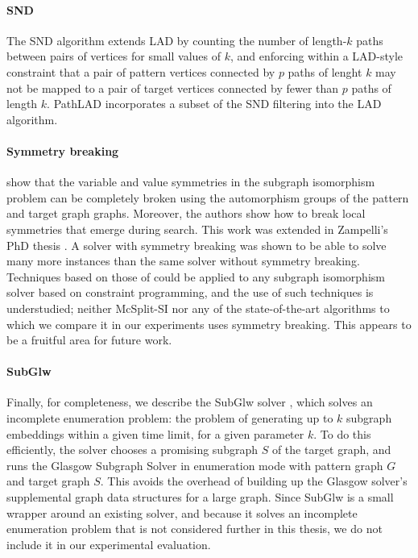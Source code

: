 \paragraph*{SND}
The SND algorithm \citep{DBLP:conf/cp/AudemardLMGP14}
extends LAD by counting the number of length-$k$ paths between
pairs of vertices for small values of $k$, and enforcing within
a LAD-style constraint that 
a pair of pattern vertices connected by $p$ paths of lenght $k$
may not be mapped to a pair of target vertices connected by fewer
than $p$ paths of length $k$.
PathLAD \citep{DBLP:conf/lion/KotthoffMS16} incorporates a subset
of the SND filtering into the LAD algorithm.

\paragraph*{Symmetry breaking}
\citet{zampelli2007symmetry} show that the variable and value symmetries
in the subgraph isomorphism problem can be completely broken using
the automorphism groups of the pattern and target graph graphs.
Moreover, the authors show how to break local symmetries that emerge
during search.
This work was extended in Zampelli's PhD thesis \citep{DBLP:phd/basesearch/Zampelli08}.
A solver with symmetry breaking was shown to be able to solve many more instances
than the same solver without symmetry breaking. 
Techniques based on those of \citeauthor{zampelli2007symmetry} 
could be applied to any subgraph isomorphism solver based on constraint programming,
and the use of such techniques is understudied; neither McSplit-SI nor any of
the state-of-the-art algorithms to which we compare it in our experiments
uses symmetry breaking.  This appears to be a fruitful area for future
work.

\paragraph*{SubGlw}
Finally, for completeness, we describe the SubGlw solver \citep{DBLP:journals/access/AnsariJA21},
which solves an incomplete enumeration problem: the problem of
generating up to $k$ subgraph embeddings within a given time limit, for a given
parameter $k$. To do this efficiently, the solver chooses a promising
subgraph $S$ of the target graph, and runs the Glasgow Subgraph Solver in enumeration
mode with pattern graph $G$ and target graph $S$. This avoids the overhead of
building up the Glasgow solver's supplemental graph data structures for a large
graph.  Since SubGlw is a small wrapper around an existing solver, and because
it solves an incomplete enumeration problem that is not considered further
in this thesis, we do not include it in our experimental evaluation.

